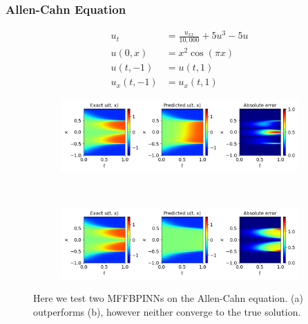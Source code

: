 \documentclass[12pt]{article}
\begin{document}
\subsubsection{Allen-Cahn Equation}
\begin{align*}
u_{t} &= \frac{u_{xx}}{10,000} + 5u^3 - 5u\\
u(0,x) &= x^2 \cos{(\pi x)}\\
u(t, -1) &= u(t,1)\\
 u_x(t, -1) &= u_x(t,1)
\end{align*}
\begin{figure}[H]
    \centering
    \begin{subfigure}{0.65\textwidth}
        \includegraphics[width=\linewidth]{imgs/cahn_dd3}
        \caption{}
        \label{subfig:a}
    \end{subfigure}
    \\ %
    \begin{subfigure}{0.65\textwidth}
        \includegraphics[width=\linewidth]{imgs/cahn3}
        \caption{}
        \label{subfig:b}
    \end{subfigure}
	\caption{Here we test two MFFBPINNs on the Allen-Cahn equation. (a) outperforms (b), however neither converge to the true solution.}
	\label{fig:cahn_res}
\end{figure}
\vspace{-5mm}
\end{document}
